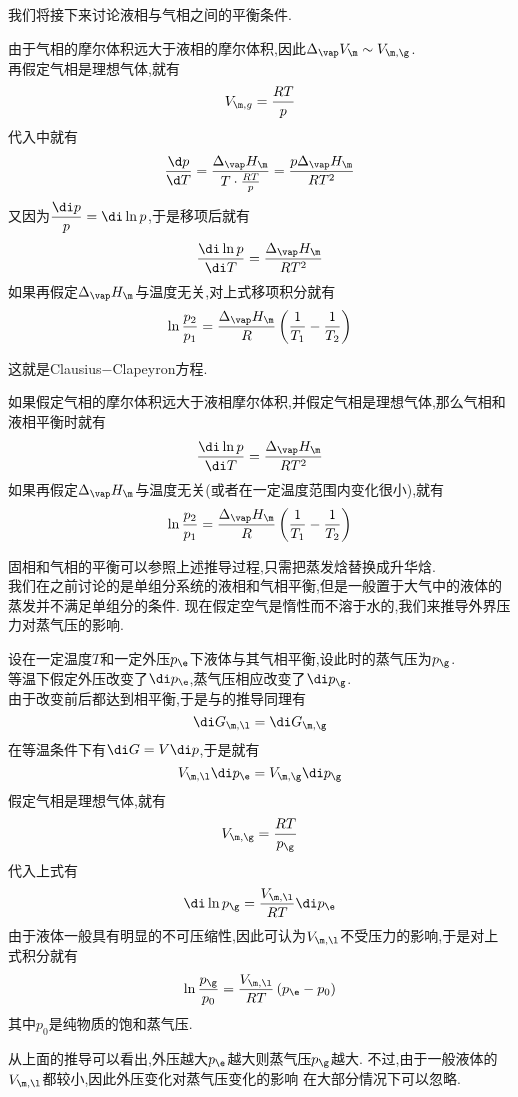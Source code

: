 \documentclass{ctexart}
\begin{document}
\vspace{4pt}
\indent 我们将接下来讨论液相与气相之间的平衡条件.
\begin{derivation}
    由于气相的摩尔体积远大于液相的摩尔体积,因此$\Delta_\vap V_\m\sim V_{\m,\g}$.\\
    再假定气相是理想气体,就有
    \[V_{\m,g}=\dfrac{RT}{p}\]
    代入中就有
    \[\dfrac{\d p}{\d T}=\dfrac{\Delta_\vap H_\m}{T\cdot\frac{RT}{p}}=\dfrac{p\Delta_\vap H_\m}{RT^2}\]
    又因为$\dfrac{\di p}{p}=\di\ln p$,于是移项后就有
    \[\dfrac{\di\ln p}{\di T}=\dfrac{\Delta_\vap H_\m}{RT^2}\]
    如果再假定$\Delta_\vap H_\m$与温度无关,对上式移项积分就有
    \[\ln\dfrac{p_2}{p_1}=\dfrac{\Delta_\vap H_\m}{R}\left(\dfrac1{T_1}-\dfrac1{T_2}\right)\]

\end{derivation}
这就是Clausius$-$Clapeyron方程.
\begin{theorem}
    如果假定气相的摩尔体积远大于液相摩尔体积,并假定气相是理想气体,那么气相和液相平衡时就有
    \[\dfrac{\di\ln p}{\di T}=\dfrac{\Delta_\vap H_\m}{RT^2}\]
    如果再假定$\Delta_\vap H_\m$与温度无关(或者在一定温度范围内变化很小),就有
    \[\ln\dfrac{p_2}{p_1}=\dfrac{\Delta_\vap H_\m}{R}\left(\dfrac1{T_1}-\dfrac1{T_2}\right)\]

\end{theorem}
固相和气相的平衡可以参照上述推导过程,只需把蒸发焓替换成升华焓.\vspace{4pt}\\
\indent 我们在之前讨论的是单组分系统的液相和气相平衡,但是一般置于大气中的液体的蒸发并不满足单组分的条件.%
现在假定空气是惰性而不溶于水的,我们来推导外界压力对蒸气压的影响.
\begin{derivation}
    设在一定温度$T$和一定外压$p_\e$下液体与其气相平衡,设此时的蒸气压为$p_\g$.\\
    等温下假定外压改变了$\di p_\e$,蒸气压相应改变了$\di p_\g$.\\
    由于改变前后都达到相平衡,于是与的推导同理有
    \[\di G_{\m,\l}=\di G_{\m,\g}\]
    在等温条件下有$\di G=V\di p$,于是就有
    \[V_{\m,\l}\di p_\e=V_{\m,\g}\di p_\g\]
    假定气相是理想气体,就有
    \[V_{\m,\g}=\dfrac{RT}{p_\g}\]
    代入上式有
    \[\di\ln p_\g=\dfrac{V_{\m,\l}}{RT}\di p_\e\]
    由于液体一般具有明显的不可压缩性,因此可认为$V_{\m,\l}$不受压力的影响,于是对上式积分就有
    \[\ln\dfrac{p_\g}{p_0}=\dfrac{V_{\m,\l}}{RT}\left(p_\e-p_0\right)\]
    其中$p_0$是纯物质的饱和蒸气压.
\end{derivation}
从上面的推导可以看出,外压越大$p_\e$越大则蒸气压$p_\g$越大.%
不过,由于一般液体的$V_{\m,\l}$都较小,因此外压变化对蒸气压变化的影响%
在大部分情况下可以忽略.
\end{document}
